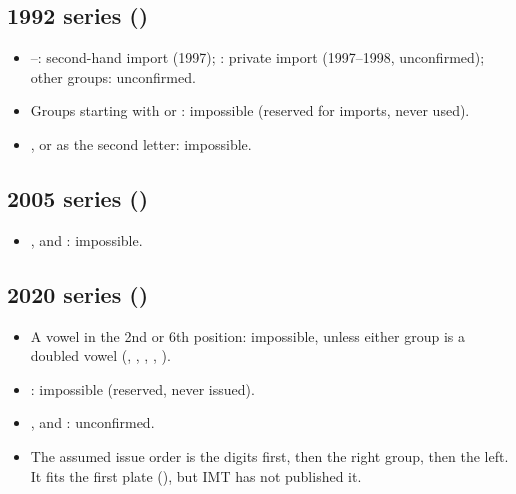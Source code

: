 \subsection{1992 series ()}
\begin{itemize}
  \item {}–: second-hand import (1997);
        : private import (1997–1998, unconfirmed); other  groups:
        unconfirmed.
  \item Groups starting with  or : impossible (reserved for
        imports, never used).
  \item {},  or  as the second letter: impossible.
\end{itemize}

\subsection{2005 series ()}
\begin{itemize}
  \item {},  and : impossible.
\end{itemize}

\subsection{2020 series ()}
\begin{itemize}
  \item A vowel in the 2nd or 6th position: impossible, unless either group is a
        doubled vowel (, , , , ).
  \item {}: impossible (reserved, never issued).
  \item {},  and : unconfirmed.
  \item The assumed issue order is the digits first, then the right group, then
        the left. It fits the first plate (), but IMT has not
        published it.
\end{itemize}

